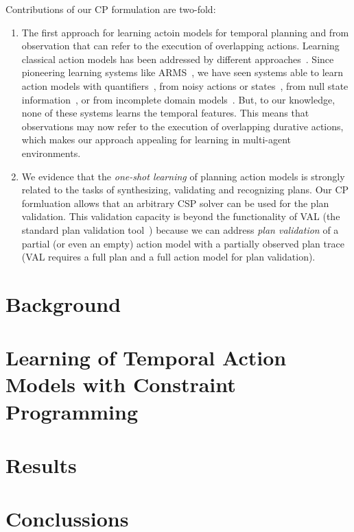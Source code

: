 \documentclass{ecai}
\begin{document}
Contributions of our CP formulation are two-fold:
\begin{enumerate}  
\item The first approach for learning actoin models for temporal planning and from observation that can refer to the execution of overlapping actions. Learning classical action models has been addressed by different approaches~\cite{arora2018review}. Since pioneering learning systems like ARMS~\cite{yang2007learning}, we have seen systems able to learn action models with quantifiers~\cite{AmirC08,ZhuoYHL10}, from noisy actions or states~\cite{MouraoZPS12,zhuo2013action}, from null state information~\cite{cresswell2013acquiring}, or from incomplete domain models~\cite{ZhuoK17,ZhuoNK13}. But, to our knowledge, none of these systems learns the temporal features. This means that observations may now refer to the execution of overlapping durative actions, which makes our approach appealing for learning in multi-agent environments.
\item We evidence that the {\em one-shot learning} of planning  action models is strongly related to the tasks of synthesizing, validating and recognizing plans. Our CP formluation allows that an arbitrary CSP solver can be used for the plan validation.  This validation capacity is beyond the functionality of VAL (the standard plan validation tool~\cite{howey2004val}) because we can address {\em plan validation} of a partial (or even an empty) action model with a partially observed plan trace (VAL requires a full plan and a full action model for plan validation).
\end{enumerate}


\section{Background}


\section{Learning of Temporal Action Models with Constraint Programming}

\section{Results}

\section{Conclussions}
  



\end{document}
